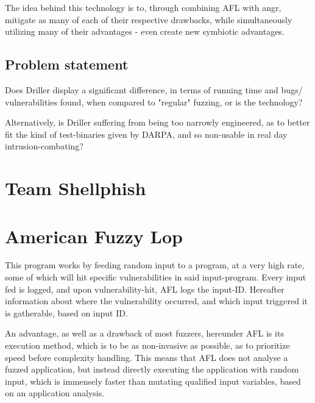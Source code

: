 \documentclass[a4paper]{article}
\begin{document}
The idea behind this technology is to, through combining AFL with angr, mitigate as many of each of their respective drawbacks, while simultaneously utilizing many of their advantages - even create new symbiotic advantages.
\subsection{Problem statement}
\label{sec:problem}
Does Driller display a significant difference, in terms of running time and bugs/ vulnerabilities found, when compared to "regular" fuzzing, or is the technology?

Alternatively, is Driller suffering from being too narrowly engineered, as to better fit the kind of test-binaries given by DARPA, and so non-usable in real day intrusion-combating?
\newpage
\section{Team Shellphish}
\label{sec:Shellphish}
\section{American Fuzzy Lop}
\label{sec:AFL}
This program works by feeding random input to a program, at a very high rate, some of which will hit specific vulnerabilities in said input-program. Every input fed is logged, and upon vulnerability-hit, AFL logs the input-ID. Hereafter information about where the vulnerability occurred, and which input triggered it is gatherable, based on input ID.

An advantage, as well as a drawback of most fuzzers, hereunder AFL is its execution method, which is to be as non-invasive as possible, as to prioritize speed before complexity handling. This means that AFL does not analyse a fuzzed application, but instead directly executing the application with random input, which is immensely faster than mutating qualified input variables, based on an application analysis.
\end{document}
